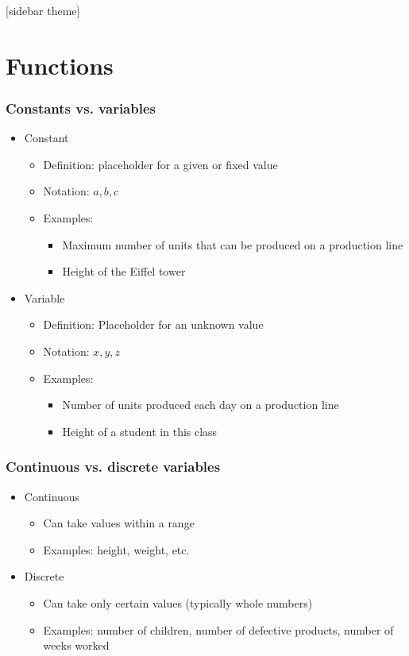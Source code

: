 \documentclass[xcolor=dvipsnames, 9pt]{beamer} %
\begin{document}
[sidebar theme]
\section{Functions}

\begin{frame}
\frametitle{Constants vs. variables}

\begin{itemize}
\item[] Constant
	\begin{itemize}
		\item Definition: placeholder for a given or fixed value
		\item Notation: $a, b, c$
		\item Examples: 
		\begin{itemize}
		\item Maximum number of units that can be produced on a production line 
		\item Height of the Eiffel tower
		\end{itemize}
	\end{itemize}
\item[]	Variable
\begin{itemize}
		\item Definition: Placeholder for an unknown value 
		\item Notation: $x, y, z$
		\item Examples:  
		\begin{itemize}
		\item Number of units produced each day on a production line  
		\item Height of a student in this class 
		\end{itemize}
	\end{itemize}
\end{itemize}
\end{frame}

\begin{frame}
\frametitle{Continuous vs. discrete variables}

\begin{itemize}
\item[] Continuous
	\begin{itemize}
		\item Can take values within a range
		\item Examples: height, weight, etc. 
	\end{itemize}
\item[]	Discrete
\begin{itemize}
		\item Can take only certain values (typically whole numbers)
		\item Examples: number of children, number of defective products, number of weeks worked
	\end{itemize}
\end{itemize}
\end{frame}
\end{document}
